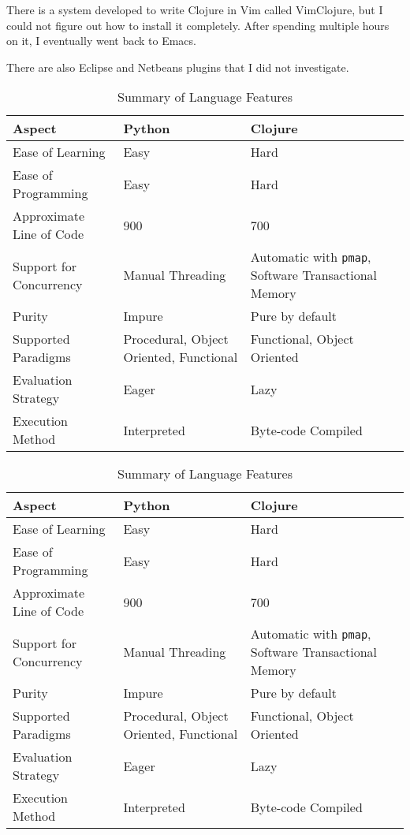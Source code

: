 \documentclass{article}
\begin{document}
There is a system developed to write Clojure in Vim called VimClojure, but I
could not figure out how to install it completely.  After spending multiple
hours on it, I eventually went back to Emacs.

There are also Eclipse and Netbeans plugins that I did not investigate.

\begin{table}[h]
    \caption{Summary of Language Features}
    \begin{tabular}{|p{1.6in}|p{1.6in}|p{1.6in}|}
        \hline
        Aspect & Python & Clojure \\
        \hline
        Ease of Learning    & Easy & Hard \\
        \hline
        Ease of Programming & Easy & Hard \\
        \hline
        Approximate Line of Code & 900 & 700 \\
        \hline
        Support for Concurrency & Manual Threading & Automatic with \texttt{pmap}, Software Transactional Memory \\
        \hline
        Purity              & Impure & Pure by default \\
        \hline
        Supported Paradigms & Procedural, Object Oriented, Functional & Functional, Object Oriented \\
        \hline
        Evaluation Strategy & Eager & Lazy \\
        \hline
        Execution Method    & Interpreted & Byte-code Compiled \\
        \hline
    \end{tabular}
\end{table}

\begin{table}[h]
    \caption{Summary of Language Features}
    \begin{tabular}{|p{1.6in}|p{1.6in}|p{1.6in}|}
        \hline
        Aspect & Python & Clojure \\
        \hline
        Ease of Learning    & Easy & Hard \\
        \hline
        Ease of Programming & Easy & Hard \\
        \hline
        Approximate Line of Code & 900 & 700 \\
        \hline
        Support for Concurrency & Manual Threading & Automatic with \texttt{pmap}, Software Transactional Memory \\
        \hline
        Purity              & Impure & Pure by default \\
        \hline
        Supported Paradigms & Procedural, Object Oriented, Functional & Functional, Object Oriented \\
        \hline
        Evaluation Strategy & Eager & Lazy \\
        \hline
        Execution Method    & Interpreted & Byte-code Compiled \\
        \hline
    \end{tabular}
\end{table}
\end{document}

